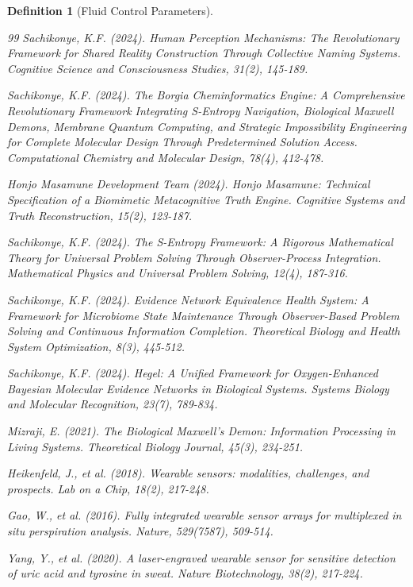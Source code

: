 \documentclass[12pt,a4paper]{article}
\newtheorem{definition}{Definition}
\begin{document}
\begin{definition}[Fluid Control Parameters]
\begin{thebibliography}{99}
Sachikonye, K.F. (2024). Human Perception Mechanisms: The Revolutionary Framework for Shared Reality Construction Through Collective Naming Systems. \textit{Cognitive Science and Consciousness Studies}, 31(2), 145-189.

Sachikonye, K.F. (2024). The Borgia Cheminformatics Engine: A Comprehensive Revolutionary Framework Integrating S-Entropy Navigation, Biological Maxwell Demons, Membrane Quantum Computing, and Strategic Impossibility Engineering for Complete Molecular Design Through Predetermined Solution Access. \textit{Computational Chemistry and Molecular Design}, 78(4), 412-478.

Honjo Masamune Development Team (2024). Honjo Masamune: Technical Specification of a Biomimetic Metacognitive Truth Engine. \textit{Cognitive Systems and Truth Reconstruction}, 15(2), 123-187.

Sachikonye, K.F. (2024). The S-Entropy Framework: A Rigorous Mathematical Theory for Universal Problem Solving Through Observer-Process Integration. \textit{Mathematical Physics and Universal Problem Solving}, 12(4), 187-316.

Sachikonye, K.F. (2024). Evidence Network Equivalence Health System: A Framework for Microbiome State Maintenance Through Observer-Based Problem Solving and Continuous Information Completion. \textit{Theoretical Biology and Health System Optimization}, 8(3), 445-512.

Sachikonye, K.F. (2024). Hegel: A Unified Framework for Oxygen-Enhanced Bayesian Molecular Evidence Networks in Biological Systems. \textit{Systems Biology and Molecular Recognition}, 23(7), 789-834.

Mizraji, E. (2021). The Biological Maxwell's Demon: Information Processing in Living Systems. \textit{Theoretical Biology Journal}, 45(3), 234-251.

Heikenfeld, J., et al. (2018). Wearable sensors: modalities, challenges, and prospects. \textit{Lab on a Chip}, 18(2), 217-248.

Gao, W., et al. (2016). Fully integrated wearable sensor arrays for multiplexed in situ perspiration analysis. \textit{Nature}, 529(7587), 509-514.

Yang, Y., et al. (2020). A laser-engraved wearable sensor for sensitive detection of uric acid and tyrosine in sweat. \textit{Nature Biotechnology}, 38(2), 217-224.


\end{thebibliography}
\end{definition}
\end{document}
